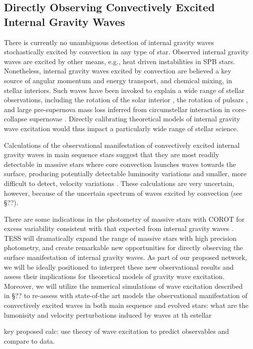 \color{blue}
\subsection{Directly Observing Convectively Excited Internal Gravity Waves}

There is currently no unambiguous detection of  internal gravity waves stochastically excited by convection in any type of star.  Observed internal gravity waves  are excited by other means, e.g., heat driven instabilities in SPB stars. Nonetheless, internal gravity waves excited by convection are believed a key source of angular momentum and energy transport, and chemical mixing, in stellar interiors.   Such waves have been invoked to explain a wide range of stellar observations, including the rotation of the solar interior \citep{kumar1999}, the rotation of pulsars \citep{fuller2015}, and large pre-supernova mass loss inferred from circumstellar interaction in core-collapse supernovae \citep{qs2012}.   Directly calibrating theoretical models of internal gravity wave excitation would thus impact a particularly wide range of stellar science.

Calculations of the observational manifestation of convectively excited internal gravity waves in main sequence stars suggest that they are most readily detectable in massive stars where core convection launches waves towards the surface, producing potentially detectable luminosity variations and smaller, more difficult to detect, velocity variations \citep{samadi2010,shiode2013}.   These calculations are very uncertain, however, because of the uncertain spectrum of waves excited by convection (see \S ??).

There are some indications in the photometry of massive stars with COROT for excess variability consistent with that expected from internal gravity waves \citep{aerts2015}.   TESS will dramatically expand the range of massive stars with high precision photometry, and create remarkable new opportunities for directly observing the surface manifestation of internal gravity waves.   
As part of our proposed network, we will be ideally positioned to interpret these new observational results and assess their implications for theoretical models of gravity wave excitation.   Moreover, we will utilize the numerical simulations of wave excitation described in \S ?? to re-assess with state-of-the art models the observational manifestation of convectively excited waves in both main sequence and evolved stars:   what are the lumonisity and velocity perturbations induced by waves at th estellar 

key proposed calc:   use theory of wave excitation to predict observables and compare to data.

